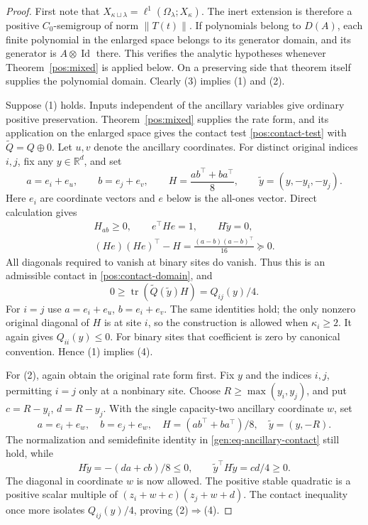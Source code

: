 \documentclass[reqno]{amsart}
\theoremstyle{definition}
\theoremstyle{remark}
\newcommand{\R}{\mathbb R}
\DeclareMathOperator{\Id}{Id}
\begin{document}
\begin{proof}
First note that
\(X_{\kappa\sqcup\lambda}=\ell^1(\Omega_\lambda;X_\kappa)\).
The inert extension is therefore a positive \(C_0\)-semigroup of norm
\(\|T(t)\|\).  If polynomials belong to \(D(A)\), each finite polynomial
in the enlarged space belongs to its generator domain, and its generator
is \(A\otimes\Id\) there.  This verifies the analytic hypotheses whenever
Theorem~\ref{pos:mixed} is applied below.  On a preserving side that theorem
itself supplies the polynomial domain.  Clearly (3) implies (1) and (2).

Suppose (1) holds.  Inputs independent of the ancillary variables give
ordinary positive preservation.  Theorem~\ref{pos:mixed} supplies the rate
form, and its application on the enlarged space gives the contact test
\eqref{pos:contact-test} with \(\widetilde Q=Q\oplus0\).
Let \(u,v\) denote the ancillary coordinates.  For distinct original
indices \(i,j\), fix any \(y\in\R^d\), and set
\[
 a=e_i+e_u,\qquad b=e_j+e_v,\qquad
 H=\frac{ab^\top+ba^\top}{8},\qquad
 \widetilde y=(y,-y_i,-y_j).
\]
Here \(e_i\) are coordinate vectors and \(e\) below is the all-ones vector.
Direct calculation gives
\begin{equation}\label{gen:eq-ancillary-contact}
 \begin{gathered}
 H_{ab}\geq0,\qquad e^\top He=1,\qquad H\widetilde y=0,\\
 (He)(He)^\top-H=\frac{(a-b)(a-b)^\top}{16}\succeq0.
 \end{gathered}
\end{equation}
All diagonals required to vanish at binary sites do vanish.  Thus this is
an admissible contact in \eqref{pos:contact-domain}, and
\[
 0\geq\operatorname{tr}(\widetilde Q(\widetilde y)H)=Q_{ij}(y)/4.
\]
For \(i=j\) use \(a=e_i+e_u\), \(b=e_i+e_v\).
The same identities hold; the only nonzero original diagonal of \(H\)
is at site \(i\), so the construction is allowed when \(\kappa_i\geq2\).
It again gives \(Q_{ii}(y)\leq0\).  For binary sites that coefficient is
zero by canonical convention.  Hence (1) implies (4).

For (2), again obtain the original rate form first.  Fix \(y\) and the
indices \(i,j\), permitting \(i=j\) only at a nonbinary site.  Choose
\(R\geq\max(y_i,y_j)\), and put \(c=R-y_i\), \(d=R-y_j\).
With the single capacity-two ancillary coordinate \(w\), set
\[
 a=e_i+e_w,\quad b=e_j+e_w,\quad
 H=(ab^\top+ba^\top)/8,\quad \widetilde y=(y,-R).
\]
The normalization and semidefinite identity in
\eqref{gen:eq-ancillary-contact} still hold, while
\[
 H\widetilde y=-(da+cb)/8\leq0,\qquad
 \widetilde y^\top H\widetilde y=cd/4\geq0.
\]
The diagonal in coordinate \(w\) is now allowed.  The positive stable
quadratic is a positive scalar multiple of
\((z_i+w+c)(z_j+w+d)\).  The contact inequality once more isolates
\(Q_{ij}(y)/4\), proving (2)$\Rightarrow$(4).


\end{proof}
\end{document}

